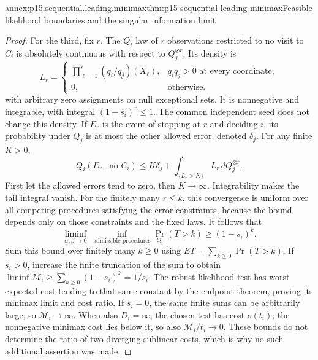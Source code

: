 \begin{annexitem}{annex:p15.sequential.leading.minimax}{thm:p15-sequential-leading-minimax}{Feasible likelihood boundaries and the singular information limit}
\begin{proof}
For the third, fix \(r\). The \(Q_i\) law of \(r\) observations
restricted to no visit to \(C_i\) is absolutely continuous with
respect to \(Q_j^{\otimes r}\). Its density is
\[
 L_r=
 \begin{cases}
 \displaystyle\prod_{\ell=1}^r(q_i/q_j)(X_\ell),
                  &q_iq_j>0\text{ at every coordinate},\\
 0,&\text{otherwise}.
 \end{cases}
\]
with arbitrary zero assignments on null exceptional sets.
It is nonnegative and integrable, with integral \((1-s_i)^r\leq1\).
The common independent seed does not change this density.
If \(E_r\) is the event of stopping at \(r\) and deciding \(i\),
its probability under \(Q_j\) is at most the other allowed error,
denoted \(\delta_j\). For any finite \(K>0\),
\[
 Q_i(E_r,\text{ no }C_i)
 \leq K\delta_j+
       \int_{\{L_r>K\}}L_r\,dQ_j^{\otimes r}.
\]
First let the allowed errors tend to zero, then \(K\to\infty\).
Integrability makes the tail integral vanish.
For the finitely many \(r\leq k\), this convergence is uniform over
all competing procedures satisfying the error constraints, because
the bound depends only on those constraints and the fixed laws.
It follows that
\[
 \liminf_{\alpha,\beta\to0}\ 
 \inf_{\text{admissible procedures}}\Pr_{Q_i}(T>k)
                      \geq(1-s_i)^k .
\]
Sum this bound over finitely many \(k\geq0\) using
\(ET=\sum_{k\geq0}\Pr(T>k)\).
If \(s_i>0\), increase the finite truncation of the sum to obtain
\(\liminf\mathcal M_i\geq\sum_{k\geq0}(1-s_i)^k=1/s_i\).
The robust likelihood test has worst expected cost tending to that
same constant by the endpoint theorem, proving its minimax limit
and cost ratio.
If \(s_i=0\), the same finite sums can be arbitrarily large, so
\(\mathcal M_i\to\infty\).
When also \(D_i=\infty\), the chosen test has cost \(o(t_i)\);
the nonnegative minimax cost lies below it, so also
\(\mathcal M_i/t_i\to0\).
These bounds do not determine the ratio of two diverging sublinear
costs, which is why no such additional assertion was made.
\end{proof}
\end{annexitem}


